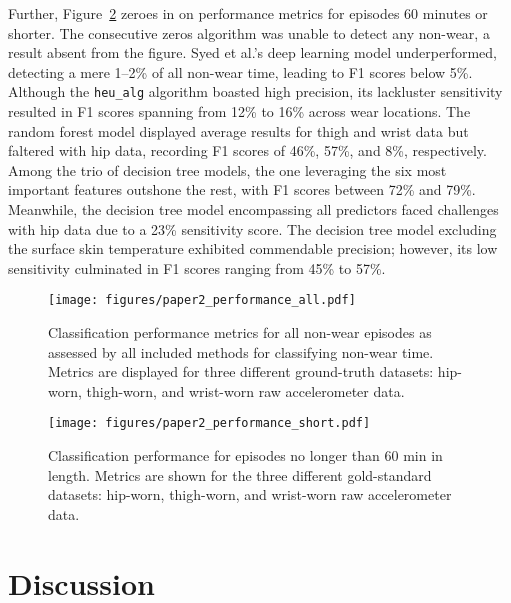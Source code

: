 \documentclass[
  10pt,
]{scrbook}
\begin{document}
Further, Figure~\ref{fig-paper2_performance_short} zeroes in on
performance metrics for episodes 60 minutes or shorter. The consecutive
zeros algorithm was unable to detect any non-wear, a result absent from
the figure. Syed et al.'s deep learning model underperformed, detecting
a mere 1--2\% of all non-wear time, leading to F1 scores below 5\%.
Although the \texttt{heu\_alg} algorithm boasted high precision, its
lackluster sensitivity resulted in F1 scores spanning from 12\% to 16\%
across wear locations. The random forest model displayed average results
for thigh and wrist data but faltered with hip data, recording F1 scores
of 46\%, 57\%, and 8\%, respectively. Among the trio of decision tree
models, the one leveraging the six most important features outshone the
rest, with F1 scores between 72\% and 79\%. Meanwhile, the decision tree
model encompassing all predictors faced challenges with hip data due to
a 23\% sensitivity score. The decision tree model excluding the surface
skin temperature exhibited commendable precision; however, its low
sensitivity culminated in F1 scores ranging from 45\% to 57\%.

\begin{figure}

{\centering \texttt{[image: figures/paper2\_performance\_all.pdf]}

}

\caption{\label{fig-paper2_performance_all}Classification performance
metrics for all non-wear episodes as assessed by all included methods
for classifying non-wear time. Metrics are displayed for three different
ground-truth datasets: hip-worn, thigh-worn, and wrist-worn raw
accelerometer data.}

\end{figure}

\begin{figure}

{\centering \texttt{[image: figures/paper2\_performance\_short.pdf]}

}

\caption{\label{fig-paper2_performance_short}Classification performance
for episodes no longer than 60 min in length. Metrics are shown for the
three different gold-standard datasets: hip-worn, thigh-worn, and
wrist-worn raw accelerometer data.}

\end{figure}

\hypertarget{discussion-1}{%
\section{Discussion}\label{discussion-1}}
\end{document}
